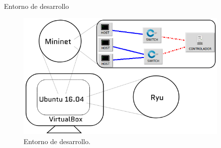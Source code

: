 \documentclass[10pt,spanish,xcolor={svgnames}]{beamer}
\begin{document}
\begin{frame}{Entorno de desarrollo}
\vspace*{2em}
\begin{figure}[h!]
	\centering
	\includegraphics[width=0.93\textwidth]{figuras/entorno_de_desarrollo.png}
	\caption{Entorno de desarrollo.}
	\label{img: entorno_de_desarrollo}
\end{figure}

\end{frame}
\end{document}
